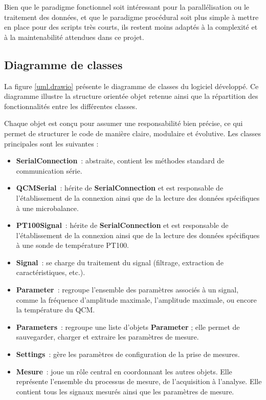 Bien que le paradigme fonctionnel soit intéressant pour la parallélisation ou le traitement des données, et que le paradigme procédural soit plus simple à mettre en place pour des scripts très courts, ils restent moins adaptés à la complexité et à la maintenabilité attendues dans ce projet.

\subsection{Diagramme de classes}

La figure \ref{uml.drawio} présente le diagramme de classes du logiciel développé. Ce diagramme illustre la structure orientée objet retenue ainsi que la répartition des fonctionnalités entre les différentes classes.

Chaque objet est conçu pour assumer une responsabilité bien précise, ce qui permet de structurer le code de manière claire, modulaire et évolutive. Les classes principales sont les suivantes :

\begin{itemize}[label=\textbullet]
  \item \textbf{SerialConnection}~: abstraite, contient les méthodes standard de communication série.
  \item \textbf{QCMSerial}~: hérite de \textbf{SerialConnection} et est responsable de l’établissement de la connexion ainsi que de la lecture des données spécifiques à une microbalance.
  \item \textbf{PT100Signal}~: hérite de \textbf{SerialConnection} et est responsable de l’établissement de la connexion ainsi que de la lecture des données spécifiques à une sonde de température PT100.
  \item \textbf{Signal}~: se charge du traitement du signal (filtrage, extraction de caractéristiques, etc.).
  \item \textbf{Parameter}~: regroupe l’ensemble des paramètres associés à un signal, comme la fréquence d’amplitude maximale, l'amplitude maximale, ou encore la température du QCM.
  \item \textbf{Parameters}~: regroupe une liste d’objets \textbf{Parameter} ; elle permet de sauvegarder, charger et extraire les paramètres de mesure.
  \item \textbf{Settings}~: gère les paramètres de configuration de la prise de mesures.
  \item \textbf{Mesure}~: joue un rôle central en coordonnant les autres objets. Elle représente l’ensemble du processus de mesure, de l’acquisition à l’analyse. Elle contient tous les signaux mesurés ainsi que les paramètres de mesure.
\end{itemize}

